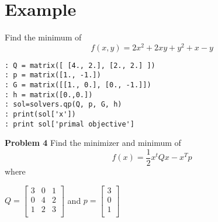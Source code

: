 \section*{Example}
Find the minimum of 
\begin{equation}
f(x,y) = 2x^2 +2xy + y^2 +x -y
\end{equation}
\begin{lstlisting}
: Q = matrix([ [4., 2.], [2., 2.] ])
: p = matrix([1., -1.])
: G = matrix([[1., 0.], [0., -1.]])
: h = matrix([0.,0.])
: sol=solvers.qp(Q, p, G, h)
: print(sol['x'])
: print sol['primal objective']
\end{lstlisting}

\textbf{Problem 4}
Find the minimizer and minimum of 
\begin{equation}
f(x) = \frac{1}{2}x^tQx - x^Tp
\end{equation}
where 

\begin{center}
$Q =
\begin{bmatrix}
3 & 0 & 1\\
0 & 4 & 2\\
1 & 2 & 3\\
\end{bmatrix}
$
and $p = 
\begin{bmatrix}
3\\
0\\
1\\
\end{bmatrix}
$
\end{center}
